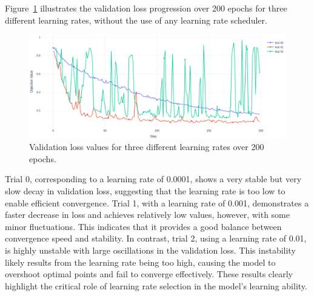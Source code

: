 Figure~\ref{fig:loss-None} illustrates the validation loss progression over 200 epochs for three different learning rates, without the use of any learning rate scheduler.
\begin{figure} [H]
    \centering 
    \includegraphics[width=1\linewidth]{PICTURES/loss_None.png} 
    \caption{Validation loss values for three different learning rates over 200 epochs.} \label{fig:loss-None} 
\end{figure}

Trial 0, corresponding to a learning rate of 0.0001, shows a very stable but very slow decay in validation loss, suggesting that the learning rate is too low to enable efficient convergence. Trial 1, with a learning rate of 0.001, demonstrates a faster decrease in loss and achieves relatively low values, however, with some minor fluctuations. This indicates that it provides a good balance between convergence speed and stability. In contrast, trial 2, using a learning rate of 0.01, is highly unstable with large oscillations in the validation loss. This instability likely results from the learning rate being too high, causing the model to overshoot optimal points and fail to converge effectively. These results clearly highlight the critical role of learning rate selection in the model’s learning ability.


